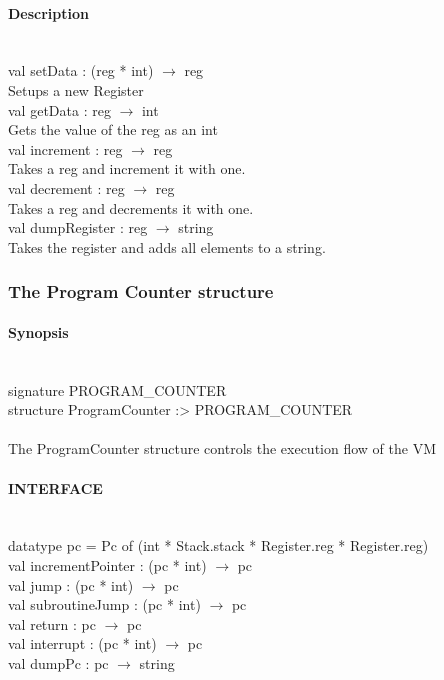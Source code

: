 \documentclass{article}
\begin{document}
\paragraph{Description} \
\\

	val setData : (reg * int) $\rightarrow$ reg\\
		Setups a new Register \\
	val getData : reg $\rightarrow$ int	\\
		Gets the value of the reg as an int\\
	val increment : reg $\rightarrow$ reg\\
		Takes a reg and increment it with one.\\
	val decrement : reg $\rightarrow$ reg\\
		Takes a reg and decrements it with one.\\
	val dumpRegister : reg $\rightarrow$ string\\
		Takes the register and adds all elements to a string.\\

\subsubsection{The Program Counter structure}
\paragraph{Synopsis} \
\\
signature PROGRAM_COUNTER\\
structure ProgramCounter :> PROGRAM_COUNTER\\
\\
The ProgramCounter structure controls the execution flow of the VM
\\
\paragraph{INTERFACE} \
\\
	datatype pc = Pc of (int * Stack.stack * Register.reg * Register.reg)
\\
	val incrementPointer : (pc * int) $\rightarrow$ pc\\
	val jump : (pc * int) $\rightarrow$ pc\\
	val subroutineJump : (pc * int) $\rightarrow$ pc\\
	val return : pc $\rightarrow$ pc\\
    val interrupt : (pc * int) $\rightarrow$ pc\\
    val dumpPc : pc $\rightarrow$ string\\
\\
\end{document}
